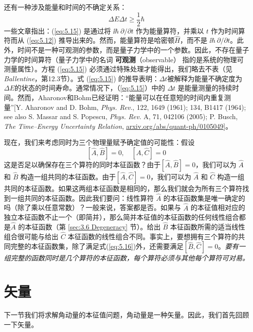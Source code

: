     还有一种涉及能量和时间的不确定关系：
    \begin{equation}
        \Delta E \Delta t \ge \frac{1}{2}\hbar
        \label{eq:5.15}
    \end{equation}
    一些文章指出：(\ref{eq:5.15}) 是通过将 $\ii \hbar \: \partial /\partial t$ 作为能量算符，并乘以 $t$ 作为时间算符而从 (\ref{eq:5.12}) 推导出来的。然而，能量算符是哈密顿$\hat{H}$，而不是 $\ii \hbar \: \partial /\partial t$。此外，时间不是一种可观测的参数，而是量子力学中的一个参数。因此，不存在量子力学的时间算符（量子力学中的名词 \textbf{可观测}（observable） 指的是系统的物理可测量属性）。方程 (\ref{eq:5.15}) 必须通过特殊处理才能得出，我们略去不表（见 \textit{Ballentine}，第12.3节）。式 (\ref{eq:5.15}) 的推导表明：$\Delta t$被解释为能量不确定度为$\Delta E$的状态的时间寿命。通常情况下，（\ref{eq:5.15}）中的 $\Delta t$ 是能量测量的持续时间。然而，Aharonov和Bohm已经证明：“能量可以在任意短的时间内重复测量”[Y. Aharonov and D. Bohm, \textit{Phys. Rev.}, 122, 1649 (1961); 134, B1417 (1964); see also S. Massar and S. Popescu, \textit{Phys. Rev.} A, 71, 042106 (2005); P. Busch, \textit{The Time–Energy Uncertainty Relation}, \url{arxiv.org/abs/quant-ph/0105049}]。

    现在，我们来考虑同时为三个物理量赋予确定值的可能性：假设
    \begin{equation}
        \left[\hat{A},\hat{B}\right] = 0, \quad \left[\hat{A},\hat{C}\right] = 0
        \label{eq:5.16}
    \end{equation}
    这是否足以确保存在三个算符的同时本征函数？由于$\left[\hat{A},\hat{B}\right] = 0$，我们可以为 $\hat{A}$ 和 $\hat{B}$ 构造一组共同的本征函数。由于$\left[\hat{A},\hat{C}\right] = 0$，我们可以为 $\hat{A}$ 和 $\hat{C}$ 构造一组共同的本征函数。如果这两组本征函数是相同的，那么我们就会为所有三个算符找到一组共同的本征函数。因此我们要问：线性算符 $\hat{A}$ 的本征函数集是唯一确定的吗（除了乘以任意常数）？一般来说，答案都是否。如果与 $\hat{A}$ 的本征值相对应的独立本征函数不止一个（即简并），那么简并本征值的本征函数的任何线性组合都是$\hat{A}$ 的本征函数（第 \ref{sec:3.6 Degeneracy} 节）。给出 $\hat{B}$ 本征函数所需的适当线性组合很可能与给出 $\hat{C}$ 本征函数的线性组合不同。事实上，要想拥有三个算符的共同完整的本征函数集，除了满足式(\ref{eq:5.16})外，还需要满足$\left[\hat{B},\hat{C}\right] = 0$。\textit{要有一组完整的函数同时是几个算符的本征函数，每个算符必须与其他每个算符可对易。}

\section{矢量}
\label{sec:5.2 Vectors}
    下一节我们将求解角动量的本征值问题，角动量是一种矢量。因此，我们首先回顾一下矢量。

